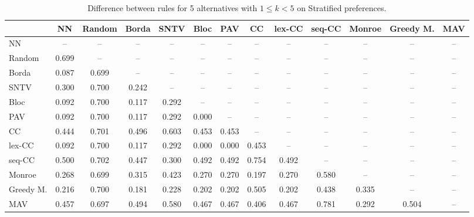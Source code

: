 
\begin{table*}[htbp]
\centering
\begin{tabular}{lcccccccccccc}
\toprule
 & NN & Random & Borda & SNTV & Bloc & PAV & CC & lex-CC & seq-CC & Monroe & Greedy M. & MAV \\
\midrule
NN & -- & -- & -- & -- & -- & -- & -- & -- & -- & -- & -- & -- \\
Random & \cellcolor{blue!69} 0.699 & -- & -- & -- & -- & -- & -- & -- & -- & -- & -- & -- \\
Borda & \cellcolor{blue!8} 0.087 & \cellcolor{blue!69} 0.699 & -- & -- & -- & -- & -- & -- & -- & -- & -- & -- \\
SNTV & \cellcolor{blue!30} 0.300 & \cellcolor{blue!70} 0.700 & \cellcolor{blue!24} 0.242 & -- & -- & -- & -- & -- & -- & -- & -- & -- \\
Bloc & \cellcolor{blue!9} 0.092 & \cellcolor{blue!70} 0.700 & \cellcolor{blue!11} 0.117 & \cellcolor{blue!29} 0.292 & -- & -- & -- & -- & -- & -- & -- & -- \\
PAV & \cellcolor{blue!9} 0.092 & \cellcolor{blue!70} 0.700 & \cellcolor{blue!11} 0.117 & \cellcolor{blue!29} 0.292 & \cellcolor{blue!0} 0.000 & -- & -- & -- & -- & -- & -- & -- \\
CC & \cellcolor{blue!44} 0.444 & \cellcolor{blue!70} 0.701 & \cellcolor{blue!49} 0.496 & \cellcolor{blue!60} 0.603 & \cellcolor{blue!45} 0.453 & \cellcolor{blue!45} 0.453 & -- & -- & -- & -- & -- & -- \\
lex-CC & \cellcolor{blue!9} 0.092 & \cellcolor{blue!70} 0.700 & \cellcolor{blue!11} 0.117 & \cellcolor{blue!29} 0.292 & \cellcolor{blue!0} 0.000 & \cellcolor{blue!0} 0.000 & \cellcolor{blue!45} 0.453 & -- & -- & -- & -- & -- \\
seq-CC & \cellcolor{blue!50} 0.500 & \cellcolor{blue!70} 0.702 & \cellcolor{blue!44} 0.447 & \cellcolor{blue!30} 0.300 & \cellcolor{blue!49} 0.492 & \cellcolor{blue!49} 0.492 & \cellcolor{blue!75} 0.754 & \cellcolor{blue!49} 0.492 & -- & -- & -- & -- \\
Monroe & \cellcolor{blue!26} 0.268 & \cellcolor{blue!69} 0.699 & \cellcolor{blue!31} 0.315 & \cellcolor{blue!42} 0.423 & \cellcolor{blue!27} 0.270 & \cellcolor{blue!27} 0.270 & \cellcolor{blue!19} 0.197 & \cellcolor{blue!27} 0.270 & \cellcolor{blue!57} 0.580 & -- & -- & -- \\
Greedy M. & \cellcolor{blue!21} 0.216 & \cellcolor{blue!70} 0.700 & \cellcolor{blue!18} 0.181 & \cellcolor{blue!22} 0.228 & \cellcolor{blue!20} 0.202 & \cellcolor{blue!20} 0.202 & \cellcolor{blue!50} 0.505 & \cellcolor{blue!20} 0.202 & \cellcolor{blue!43} 0.438 & \cellcolor{blue!33} 0.335 & -- & -- \\
MAV & \cellcolor{blue!45} 0.457 & \cellcolor{blue!69} 0.697 & \cellcolor{blue!49} 0.494 & \cellcolor{blue!57} 0.580 & \cellcolor{blue!46} 0.467 & \cellcolor{blue!46} 0.467 & \cellcolor{blue!40} 0.406 & \cellcolor{blue!46} 0.467 & \cellcolor{blue!78} 0.781 & \cellcolor{blue!29} 0.292 & \cellcolor{blue!50} 0.504 & -- \\
\bottomrule
\end{tabular}

\caption{Difference between rules for 5 alternatives with $1 \leq k < 5$ on Stratified preferences.}
\label{tab:rule_distance_heatmap-m=[5]-pref_dist=stratification__args__weight=0.5}
\end{table*}
    